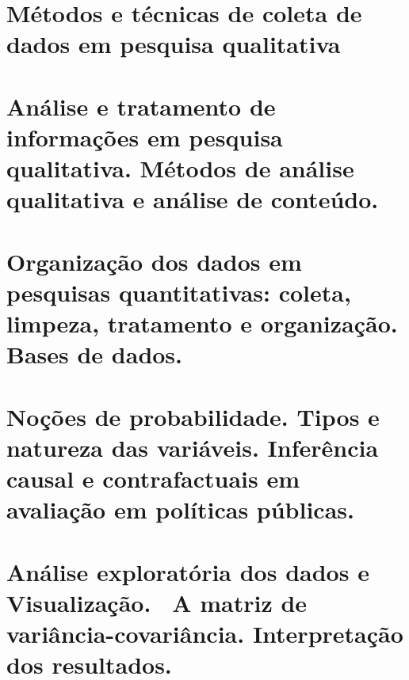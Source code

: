 \documentclass[
]{book}
\begin{document}
\hypertarget{intro}{%
\chapter{Métodos e técnicas de coleta de dados em pesquisa qualitativa}\label{intro}}

\hypertarget{anuxe1lise-e-tratamento-de-informauxe7uxf5es-em-pesquisa-qualitativa.-muxe9todos-de-anuxe1lise-qualitativa-e-anuxe1lise-de-conteuxfado.}{%
\chapter{Análise e tratamento de informações em pesquisa qualitativa. Métodos de análise qualitativa e análise de conteúdo.}\label{anuxe1lise-e-tratamento-de-informauxe7uxf5es-em-pesquisa-qualitativa.-muxe9todos-de-anuxe1lise-qualitativa-e-anuxe1lise-de-conteuxfado.}}

\hypertarget{organizauxe7uxe3o-dos-dados-em-pesquisas-quantitativas-coleta-limpeza-tratamento-e-organizauxe7uxe3o.-bases-de-dados.}{%
\chapter{Organização dos dados em pesquisas quantitativas: coleta, limpeza, tratamento e organização. Bases de dados.}\label{organizauxe7uxe3o-dos-dados-em-pesquisas-quantitativas-coleta-limpeza-tratamento-e-organizauxe7uxe3o.-bases-de-dados.}}

\hypertarget{nouxe7uxf5es-de-probabilidade.-tipos-e-natureza-das-variuxe1veis.-inferuxeancia-causal-e-contrafactuais-em-avaliauxe7uxe3o-em-poluxedticas-puxfablicas.}{%
\chapter{Noções de probabilidade. Tipos e natureza das variáveis. Inferência causal e contrafactuais em avaliação em políticas públicas.}\label{nouxe7uxf5es-de-probabilidade.-tipos-e-natureza-das-variuxe1veis.-inferuxeancia-causal-e-contrafactuais-em-avaliauxe7uxe3o-em-poluxedticas-puxfablicas.}}

\hypertarget{anuxe1lise-exploratuxf3ria-dos-dados-e-visualizauxe7uxe3o.-a-matriz-de-variuxe2ncia-covariuxe2ncia.-interpretauxe7uxe3o-dos-resultados.}{%
\chapter{Análise exploratória dos dados e Visualização.~ A matriz de variância-covariância. Interpretação dos resultados.}\label{anuxe1lise-exploratuxf3ria-dos-dados-e-visualizauxe7uxe3o.-a-matriz-de-variuxe2ncia-covariuxe2ncia.-interpretauxe7uxe3o-dos-resultados.}}
\end{document}

